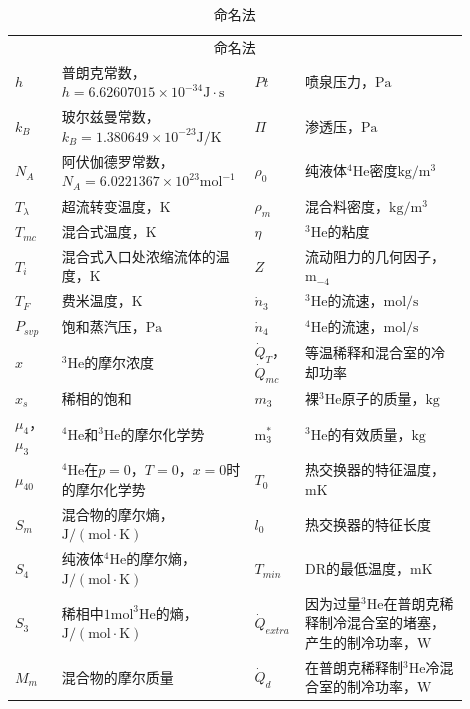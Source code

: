 \begin{table}[H]
	\centering
	\caption{命名法}
	\label{T1}
	\begin{tabular}{m{0.1\linewidth}m{0.35\linewidth}m{0.1\linewidth}m{0.35\linewidth}}
		\toprule
		\multicolumn{4}{c}{命名法} \\
		$h$ & 普朗克常数，$h=6.62607015\times10^{-34}\mathrm{J\cdot s}$ & $Pt$ & 喷泉压力，$\mathrm{Pa}$ \\
		$k_B$ & 玻尔兹曼常数，$k_B=1.380649\times10^{-23}\mathrm{J/K}$ & $\Pi$ & 渗透压，$\mathrm{Pa}$ \\
		$N_A$ & 阿伏伽德罗常数，$N_A=6.0221367\times 10^{23}\mathrm{mol^{-1}}$ & $\rho_0$ & 纯液体$\mathrm{^4He}$密度$\mathrm{kg/m^3}$ \\
		$T_\lambda$ & 超流转变温度，$\mathrm{K}$ & $\rho_m$ &混合料密度，$\mathrm{kg/m^3}$ \\
		$T_{mc}$ & 混合式温度，$\mathrm{K}$ & $\eta$ & $^3\mathrm{He}$的粘度 \\
		$T_i$ & 混合式入口处浓缩流体的温度，$\mathrm{K}$ & $Z$ & 流动阻力的几何因子，$\mathrm{m_{-4}}$ \\
		$T_F$ & 费米温度，$\mathrm{K}$ & $\dot{n}_3$ & $\mathrm{^3He}$的流速，$\mathrm{mol/s}$ \\ 
		$P_{svp}$ & 饱和蒸汽压，$\mathrm{Pa}$ & $\dot{n}_4$ & $\mathrm{^4He}$的流速，$\mathrm{mol/s}$ \\
		$x$ & $\mathrm{^3He}$的摩尔浓度 & $\dot{Q}_T$，$\dot{Q}_{mc}$ & 等温稀释和混合室的冷却功率 \\
		$x_s$ &稀相的饱和&$m_3$& 裸$\mathrm{^3He}$原子的质量，$\mathrm{kg}$ \\
		$\mu_4$，$\mu_3$ & $\mathrm{^4He}$和$\mathrm{^3He}$的摩尔化学势 & $\mathrm{m_3^*}$ & $\mathrm{^3He}$的有效质量，$\mathrm{kg}$ \\
		$\mu_{40}$ & $\mathrm{^4He}$在$p=0$，$T=0$，$x=0$时的摩尔化学势 & $T_0$ & 热交换器的特征温度，$\mathrm{mK}$ \\
		$S_m$ & 混合物的摩尔熵，$\mathrm{J/(mol\cdot K)}$ & $l_0$ & 热交换器的特征长度 \\
		$S_4$ & 纯液体$\mathrm{^4He}$的摩尔熵，$\mathrm{J/(mol\cdot K)}$ & $T_{min}$ & DR的最低温度，$\mathrm{mK}$ \\
		$S_3$ & 稀相中$\mathrm{1 mol ^3He}$的熵，$\mathrm{J/(mol\cdot K)}$ & $\dot{Q}_{extra}$ & 因为过量$\mathrm{^3He}$在普朗克稀释制冷混合室的堵塞，产生的制冷功率，$\mathrm{W}$ \\
		$M_m$ & 混合物的摩尔质量 & $\dot{Q}_d$ & 在普朗克稀释制$\mathrm{^3He}$冷混合室的制冷功率，$\mathrm{W}$ \\

\end{tabular}
\end{table}
